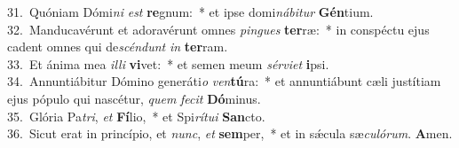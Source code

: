 {31.~}Quóniam Dómi\textit{ni} \textit{est} \textbf{re}gnum:~* et ipse domi\textit{ná}\textit{bi}\textit{tur} \textbf{Gén}tium.\\
{32.~}Manducavérunt et adoravérunt omnes \textit{pin}\textit{gues} \textbf{ter}ræ:~* in conspéctu ejus cadent omnes qui de\textit{scén}\textit{dunt} \textit{in} \textbf{ter}ram.\\
{33.~}Et ánima mea \textit{il}\textit{li} \textbf{vi}vet:~* et semen meum \textit{sér}\textit{vi}\textit{et} \textbf{i}psi.\\
{34.~}Annuntiábitur Dómino generáti\textit{o} \textit{ven}\textbf{tú}ra:~* et annuntiábunt cæli justítiam ejus pópulo qui nascétur, \textit{quem} \textit{fe}\textit{cit} \textbf{Dó}minus.\\
{35.~}Glória Pa\textit{tri}, \textit{et} \textbf{Fí}lio,~* et Spi\textit{rí}\textit{tu}\textit{i} \textbf{San}cto.\\
{36.~}Sicut erat in princípio, et \textit{nunc}, \textit{et} \textbf{sem}per,~* et in sǽcula sæ\textit{cu}\textit{ló}\textit{rum}. \textbf{A}men.\\
